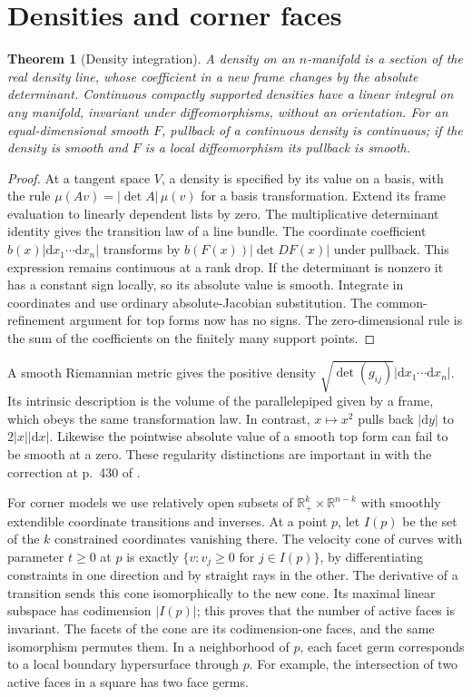 \documentclass[11pt,oneside,openany]{book}
\newtheorem{theorem}{Theorem}[chapter]
\theoremstyle{definition}
\theoremstyle{remark}
\newcommand{\R}{\mathbb R}
\newcommand{\dd}{\mathrm d}
\begin{document}
\section{Densities and corner faces}

\begin{theorem}[Density integration]
\label{p104:M10.05}
A density on an \(n\)-manifold is a section of the real density line,
whose coefficient in a new frame changes by the absolute determinant.
Continuous compactly supported densities have a linear integral on any
manifold, invariant under diffeomorphisms, without an orientation.
For an equal-dimensional smooth \(F\), pullback of a continuous density
is continuous; if the density is smooth and \(F\) is a local
diffeomorphism its pullback is smooth.
\end{theorem}
\begin{proof}
At a tangent space \(V\), a density is specified by its value on a
basis, with the rule \(\mu(A v)=|\det A|\,\mu(v)\) for a basis
transformation. Extend its frame evaluation to linearly dependent
lists by zero. The multiplicative determinant identity gives the
transition law of a line bundle. The coordinate coefficient
\(b(x)|\dd x_1\cdots\dd x_n|\) transforms by
\(b(F(x))|\det DF(x)|\) under pullback. This expression remains
continuous at a rank drop. If the determinant is nonzero it has a
constant sign locally, so its absolute value is smooth. Integrate in
coordinates and use ordinary absolute-Jacobian substitution. The
common-refinement argument for top forms now has no signs. The
zero-dimensional rule is the sum of the coefficients on the
finitely many support points.
\end{proof}
A smooth Riemannian metric gives the positive density
\(\sqrt{\det(g_{ij})}|\dd x_1\cdots\dd x_n|\). Its intrinsic description
is the volume of the parallelepiped given by a frame, which obeys the
same transformation law. In contrast, \(x\mapsto x^2\) pulls back
\(|\dd y|\) to \(2|x||\dd x|\). Likewise the pointwise absolute value
of a smooth top form can fail to be smooth at a zero. These
regularity distinctions are important in \cite[Propositions
16.35--16.42]{lee} with the correction at p.~430 of \cite{leeerrata}.

For corner models we use relatively open subsets of
\(\R_+^k\times\R^{n-k}\) with smoothly extendible coordinate transitions
and inverses. At a point \(p\), let \(I(p)\) be the set of the \(k\)
constrained coordinates vanishing there. The velocity cone of curves
with parameter \(t\geq0\) at \(p\) is exactly
\(\{v:v_j\geq0\text{ for }j\in I(p)\}\), by differentiating
constraints in one direction and by straight rays in the other.
The derivative of a transition sends this cone isomorphically to the
new cone. Its maximal linear subspace has codimension \(|I(p)|\);
this proves that the number of active faces is invariant. The facets
of the cone are its codimension-one faces, and the same isomorphism
permutes them. In a neighborhood of \(p\), each facet germ corresponds
to a local boundary hypersurface through \(p\). For example, the
intersection of two active faces in a square has two face germs.
\end{document}

